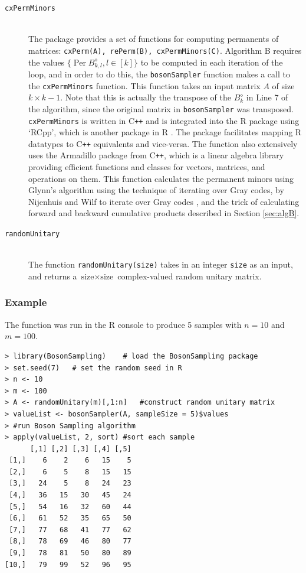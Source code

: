 \documentclass[11pt]{article}
\theoremstyle{theorem}
\theoremstyle{remark}
\theoremstyle{plain}
\theoremstyle{definition}
\DeclareMathOperator*{\Per}{\mathrm{Per}}
\begin{document}
\begin{description}
\item[\texttt{cxPermMinors}] \hfill \\ The package provides a set of functions for computing permanents of matrices: \texttt{cxPerm(A), rePerm(B), cxPermMinors(C)}. Algorithm B requires the values $\{ \Per B_{k, l}^{\diamond}, l \in [k] \}$ to be computed in each iteration of the loop, and in order to do this, the \texttt{bosonSampler} function makes a call to the \texttt{cxPermMinors} function. This function takes an input matrix $A$ of size $k \times k-1$. Note that this is actually the transpose of the $B_k^{\diamond}$ in Line 7 of the algorithm, since the original matrix in \texttt{bosonSampler} was transposed. \texttt{cxPermMinors} is written in C\texttt{++} and is integrated into the R package using `RCpp', which is another package in R \cite{rcpp}. The package facilitates  mapping R datatypes to C\texttt{++} equivalents and vice-versa. The function also extensively uses the Armadillo package from C\texttt{++}\cite{armadillo}, which is a linear algebra library providing efficient functions and classes for vectors, matrices, and operations on them. This function calculates the permanent minors using Glynn's algorithm \cite{glynn2010} using the technique of iterating over Gray codes, by Nijenhuis and Wilf\cite{Nijenhuis1978} to iterate over Gray codes , and the trick of calculating forward and backward cumulative products described in Section \ref{sec:algB}.
\item[\texttt{randomUnitary}] \hfill \\The function \texttt{randomUnitary(size)} takes in an integer \texttt{size} as an input, and returns a $\text{size} \times \text{size}$ complex-valued random unitary matrix.
\end{description}
\subsubsection*{Example}
The function was run in the R console to produce 5 samples with $n = 10$ and $m = 100$.
\begin{verbatim}
> library(BosonSampling)	# load the BosonSampling package
> set.seed(7)	# set the random seed in R
> n <- 10
> m <- 100
> A <- randomUnitary(m)[,1:n]	#construct random unitary matrix
> valueList <- bosonSampler(A, sampleSize = 5)$values
> #run Boson Sampling algorithm
> apply(valueList, 2, sort) #sort each sample
      [,1] [,2] [,3] [,4] [,5]
 [1,]    6    2    6   15    5
 [2,]    6    5    8   15   15
 [3,]   24    5    8   24   23
 [4,]   36   15   30   45   24
 [5,]   54   16   32   60   44
 [6,]   61   52   35   65   50
 [7,]   77   68   41   77   62
 [8,]   78   69   46   80   77
 [9,]   78   81   50   80   89
[10,]   79   99   52   96   95
\end{verbatim}
\end{document}
